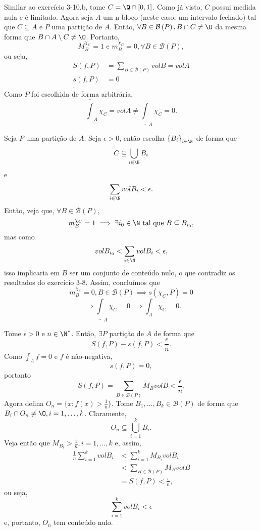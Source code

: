 \documentclass[a4paper]{report}
\begin{document}

Similar ao exercício 3-10.b, tome $C = \Q\cap \left[ 0,1 \right] $. Como já visto, $C$ possui medida nula e é limitado. Agora seja $A$ um n-bloco (neste caso, um intervalo fechado) tal que $C \subseteq A$ e $P$ uma partição de $A$. Então, $\forall B\in \mathcal{B}\left( P \right), B\cap C \neq \O $ da mesma forma que $B \cap A\setminus C \neq \O$. Portanto, \[
M_B^{\chi_C} = 1\text{ e } m_B^{\chi_C}=0, \forall B\in \mathcal{B}\left( P \right) 
,\] ou seja, 
\begin{align*}
    S\left( f, P \right) &= \sum_{B\in \mathcal{B}\left( P \right) } vol B = vol A \\
    s\left( f,P \right) &= 0 \\
.\end{align*}
Como $P$ foi escolhida de forma arbitrária, \[
\overline{\int}_A \chi_C = vol A \neq \underline{\int}_A \chi_C = 0
.\]


Seja $P$ uma partição de $A$. Seja $\epsilon > 0$, então escolha $\left\{ B_i \right\} _{i\in \N}$ de forma que \[
C \subseteq \bigcup_{i\in \N} B_i
\] e \[
\sum_{i\in \N} vol B_i < \epsilon
.\] Então, veja que, $\forall B\in \mathcal{B}\left( P \right) $, \[
m_B^{\chi_C} = 1 \implies \exists i_0\in \N \text{ tal que } B \subseteq B_{i_0}
,\] mas como \[
vol B_{i_0} < \sum_{i\in \N} vol B_i < \epsilon
,\] isso implicaria em $B$ ser um conjunto de conteúdo nulo, o que contradiz os resultados do exercício 3-8. Assim, concluímos que \[
m_B^{\chi_C} = 0, B \in \mathcal{B}\left( P \right) \implies s\left( \chi_C, P \right) = 0
\] \[
\implies \underline{\int}_A \chi_C = 0 \implies \int_A \chi_C = 0
.\]


Tome $\epsilon > 0$ e $n\in \N^*$. Então, $\exists P$ partição de $A$ de forma que \[
S\left( f, P  \right) - s\left( f, P \right) < \frac{\epsilon}{n}
.\] 
Como $\int_A f=0$ e $f$ é não-negativa, \[
s\left( f, P \right) = 0
,\] portanto \[
S\left( f, P \right) = \sum_{B\in \mathcal{B}\left( P \right) } M_B vol B  < \frac{\epsilon}{n}
.\] Agora defina $O_n = \{x : f\left( x \right) > \frac{1}{n}\} $. Tome $B_1,\ldots,B_{k} \in \mathcal{B}\left(P  \right) $ de forma que $B_i \cap O_n \neq \O, i=1,\ldots,k$. Claramente, \[
O_n \subseteq \bigcup_{i=1} ^{k} B_i
.\] Veja então que $M_{B_i} > \frac{1}{n}, i=1,\ldots,k$ e, assim,
\begin{align*}
    \frac{1}{n} \sum_{i=1}^{k} vol B_i &< \sum_{i=1}^{k} M_{B_i} vol B_i \\
				       &< \sum_{B\in \mathcal{B}\left( P \right) } M_B vol B \\
				       &= S\left( f, P \right) < \frac{\epsilon}{n}
,\end{align*}
ou seja, \[
\sum_{i=1}^{k} vol B_i < \epsilon
\] e, portanto, $O_n$ tem conteúdo nulo.
\end{document}
